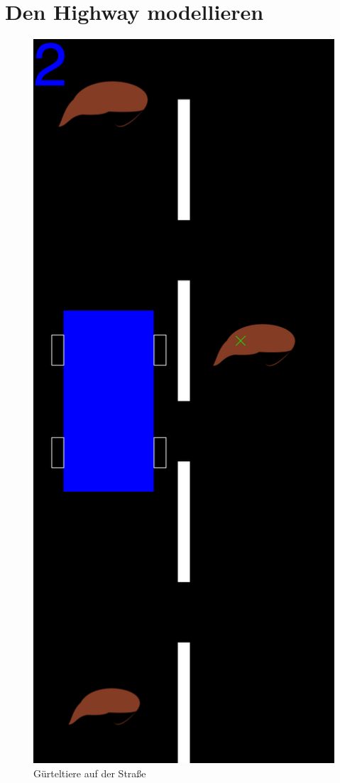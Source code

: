 \section{Den Highway modellieren}
\label{sec:highway-model}

\begin{figure}[tb]
  \centering
  \includegraphics[height=0.4\textheight]{videospiele/dillo-world}
  \caption{Gürteltiere auf der Straße}
  \label{fig:dillo-world}
\end{figure}

